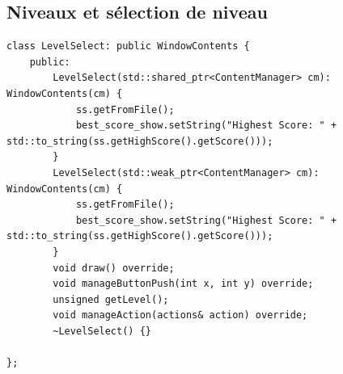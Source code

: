 \documentclass[a4paper, 12pt]{article}
\begin{document}
\subsection{Niveaux et sélection de niveau}
\begin{lstlisting}
class LevelSelect: public WindowContents {
    public:
        LevelSelect(std::shared_ptr<ContentManager> cm): WindowContents(cm) {
            ss.getFromFile();
            best_score_show.setString("Highest Score: " + std::to_string(ss.getHighScore().getScore()));
        }
        LevelSelect(std::weak_ptr<ContentManager> cm): WindowContents(cm) {
            ss.getFromFile();
            best_score_show.setString("Highest Score: " + std::to_string(ss.getHighScore().getScore()));
        }
        void draw() override;
        void manageButtonPush(int x, int y) override;
        unsigned getLevel();
        void manageAction(actions& action) override;
        ~LevelSelect() {}

};
\end{lstlisting}
\end{document}
